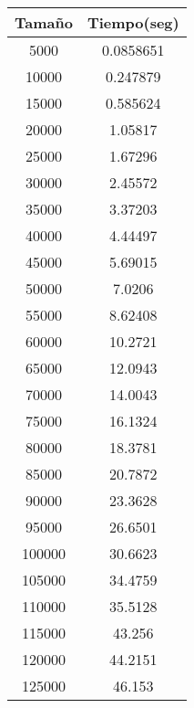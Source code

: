 \begin{longtable}{|c|c|}
\hline
\textbf{Tamaño} & \textbf{Tiempo(seg)} \\ \hline
5000   & 0.0858651   \\ \hline
10000  & 0.247879    \\ \hline
15000  & 0.585624    \\ \hline
20000  & 1.05817     \\ \hline
25000  & 1.67296     \\ \hline
30000  & 2.45572     \\ \hline
35000  & 3.37203     \\ \hline
40000  & 4.44497     \\ \hline
45000  & 5.69015     \\ \hline
50000  & 7.0206      \\ \hline
55000  & 8.62408     \\ \hline
60000  & 10.2721     \\ \hline
65000  & 12.0943     \\ \hline
70000  & 14.0043     \\ \hline
75000  & 16.1324     \\ \hline
80000  & 18.3781     \\ \hline
85000  & 20.7872     \\ \hline
90000  & 23.3628     \\ \hline
95000  & 26.6501     \\ \hline
100000 & 30.6623     \\ \hline
105000 & 34.4759     \\ \hline
110000 & 35.5128     \\ \hline
115000 & 43.256      \\ \hline
120000 & 44.2151     \\ \hline
125000 & 46.153      \\ \hline
\end{longtable}
